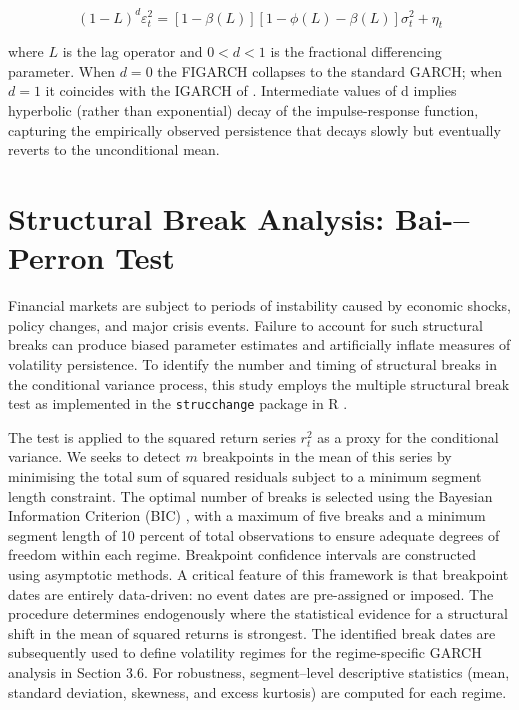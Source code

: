 \begin{equation}
(1 - L)^d \varepsilon_t^2
=
\left[ 1 - \beta(L) \right]
\left[ 1 - \phi(L) - \beta(L) \right]
\sigma_t^2
+
\eta_t
\end{equation}

where $L$ is the lag operator and $0 < d < 1$ is the fractional differencing parameter. When $d =0$ the FIGARCH collapses to the standard GARCH; when $d = 1$ it coincides with the IGARCH of 
\cite{engleboll1986}. Intermediate values of d implies hyperbolic (rather than exponential) decay of the impulse-response function, capturing the empirically observed persistence that decays slowly but eventually reverts to the unconditional mean.


\section{Structural Break Analysis: Bai-–Perron Test}

Financial markets are subject to periods of instability caused by economic shocks, policy changes, and major crisis events. Failure to account for such structural breaks can produce biased parameter estimates and artificially inflate measures of volatility persistence. To identify the number and timing of structural breaks in the conditional variance process, this study employs the \cite{baiperron1998,baiperron2003} multiple structural break test  as implemented in the \texttt{strucchange} package in R  \citet{zeileis2002}. 

The test is applied to the squared return series $r 
_t^2$ as a proxy for the conditional variance. We seeks to detect $m$ breakpoints in the mean of this series by minimising the total sum of squared residuals subject to a minimum segment length constraint. The optimal number of breaks is selected using the Bayesian Information Criterion (BIC) \citep{schwarz1978}, with a maximum of five breaks and a minimum segment length of 10 percent of total observations to ensure adequate degrees of freedom within each regime. Breakpoint confidence intervals are constructed using asymptotic methods. A critical feature of this framework is that breakpoint dates are entirely data-driven: no event dates are pre-assigned or imposed. The procedure determines endogenously where the statistical evidence for a structural shift in the mean of squared returns is strongest. The identified break dates are subsequently used to define volatility regimes for the regime-specific GARCH analysis in Section 3.6. For robustness, segment--level descriptive statistics (mean, standard deviation, skewness, and excess kurtosis) are computed for each regime.


